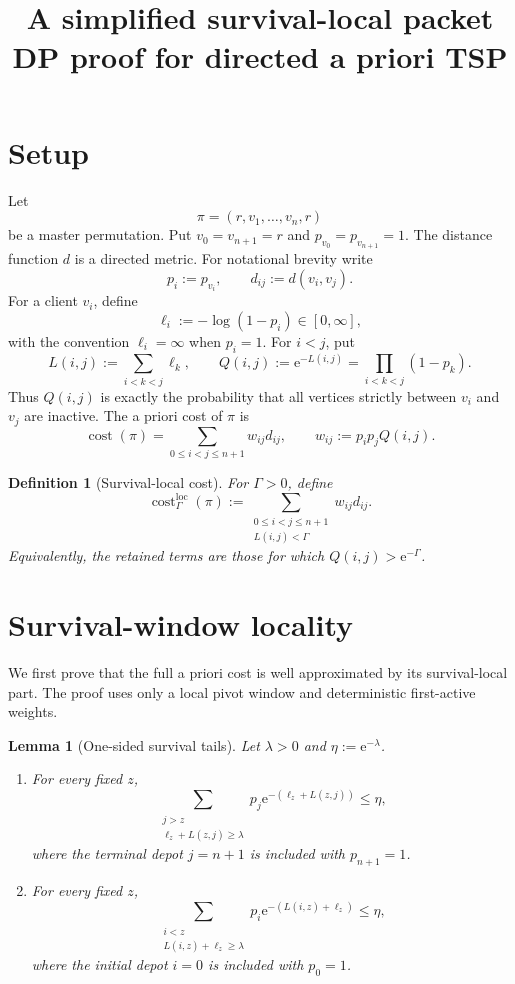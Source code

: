 \documentclass[11pt]{article}
\title{A simplified survival-local packet DP proof for directed a priori TSP}
\author{}
\date{}
\newtheorem{lemma}{Lemma}
\newtheorem{definition}{Definition}
\newcommand{\cost}{\operatorname{cost}}
\newcommand{\loc}{\operatorname{loc}}
\newcommand{\e}{\mathrm e}
\begin{document}
\maketitle

\section{Setup}

Let
\[
    \pi=(r,v_1,\dots,v_n,r)
\]
be a master permutation.  Put $v_0=v_{n+1}=r$ and
$p_{v_0}=p_{v_{n+1}}=1$.  The distance function $d$ is a directed metric.  For
notational brevity write
\[
    p_i:=p_{v_i},
    \qquad
    d_{ij}:=d(v_i,v_j).
\]
For a client $v_i$, define
\[
    \ell_i:=-\log(1-p_i)\in[0,\infty],
\]
with the convention $\ell_i=\infty$ when $p_i=1$.  For $i<j$, put
\[
    L(i,j):=\sum_{i<k<j}\ell_k,
    \qquad
    Q(i,j):=\e^{-L(i,j)}=\prod_{i<k<j}(1-p_k).
\]
Thus $Q(i,j)$ is exactly the probability that all vertices strictly between
$v_i$ and $v_j$ are inactive.  The a priori cost of $\pi$ is
\[
    \cost(\pi)
    =
    \sum_{0\le i<j\le n+1}w_{ij}d_{ij},
    \qquad
    w_{ij}:=p_i p_j Q(i,j).
\]

\begin{definition}[Survival-local cost]
For $\Gamma>0$, define
\[
    \cost^{\loc}_{\Gamma}(\pi)
    :=
    \sum_{\substack{0\le i<j\le n+1\\ L(i,j)<\Gamma}}
    w_{ij}d_{ij}.
\]
Equivalently, the retained terms are those for which
$Q(i,j)>\e^{-\Gamma}$.
\end{definition}

\section{Survival-window locality}

We first prove that the full a priori cost is well approximated by its
survival-local part.  The proof uses only a local pivot window and deterministic
first-active weights.

\begin{lemma}[One-sided survival tails]\label{lem:survival-tail}
Let $\lambda>0$ and $\eta:=\e^{-\lambda}$.
\begin{enumerate}[label=(\roman*)]
\item For every fixed $z$,
\[
    \sum_{\substack{j>z\\ \ell_z+L(z,j)\ge\lambda}}
    p_j\e^{-(\ell_z+L(z,j))}
    \le \eta,
\]
where the terminal depot $j=n+1$ is included with $p_{n+1}=1$.

\item For every fixed $z$,
\[
    \sum_{\substack{i<z\\ L(i,z)+\ell_z\ge\lambda}}
    p_i\e^{-(L(i,z)+\ell_z)}
    \le \eta,
\]
where the initial depot $i=0$ is included with $p_0=1$.
\end{enumerate}
\end{lemma}
\end{document}
